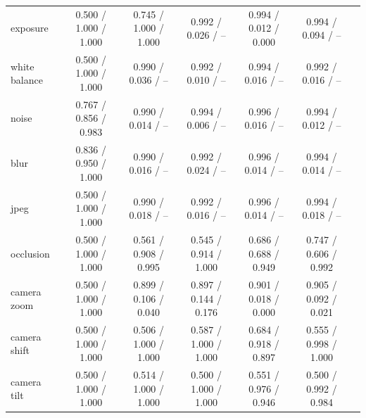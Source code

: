 \documentclass{article}
\begin{document}
\begin{table}[t]
{\begin{tabular}{lcccccc}
exposure & 0.500 / 1.000 / 1.000 & 0.745 / 1.000 / 1.000 & 0.992 / 0.026 / -- & 0.994 / 0.012 / 0.000 & 0.994 / 0.094 / -- &  \\
white balance & 0.500 / 1.000 / 1.000 & 0.990 / 0.036 / -- & 0.992 / 0.010 / -- & 0.994 / 0.016 / -- & 0.992 / 0.016 / -- &  \\
noise & 0.767 / 0.856 / 0.983 & 0.990 / 0.014 / -- & 0.994 / 0.006 / -- & 0.996 / 0.016 / -- & 0.994 / 0.012 / -- &  \\
blur & 0.836 / 0.950 / 1.000 & 0.990 / 0.016 / -- & 0.992 / 0.024 / -- & 0.996 / 0.014 / -- & 0.994 / 0.014 / -- &  \\
jpeg & 0.500 / 1.000 / 1.000 & 0.990 / 0.018 / -- & 0.992 / 0.016 / -- & 0.996 / 0.014 / -- & 0.994 / 0.018 / -- &  \\
occlusion & 0.500 / 1.000 / 1.000 & 0.561 / 0.908 / 0.995 & 0.545 / 0.914 / 1.000 & 0.686 / 0.688 / 0.949 & 0.747 / 0.606 / 0.992 &  \\
camera zoom & 0.500 / 1.000 / 1.000 & 0.899 / 0.106 / 0.040 & 0.897 / 0.144 / 0.176 & 0.901 / 0.018 / 0.000 & 0.905 / 0.092 / 0.021 &  \\
camera shift & 0.500 / 1.000 / 1.000 & 0.506 / 1.000 / 1.000 & 0.587 / 1.000 / 1.000 & 0.684 / 0.918 / 0.897 & 0.555 / 0.998 / 1.000 &  \\
camera tilt & 0.500 / 1.000 / 1.000 & 0.514 / 1.000 / 1.000 & 0.500 / 1.000 / 1.000 & 0.551 / 0.976 / 0.946 & 0.500 / 0.992 / 0.984 &  \\
\bottomrule
\end{tabular}}
\end{table}
\end{document}
